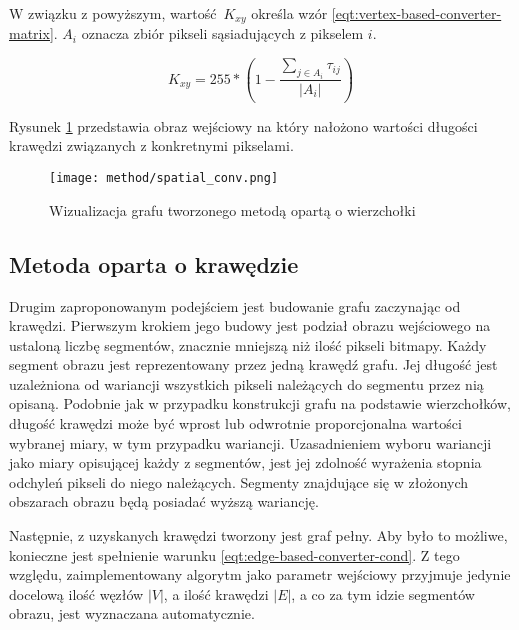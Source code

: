 {{{            W związku z powyższym, wartość $K_{xy}$ określa wzór \ref{eqt:vertex-based-converter-matrix}. $A_i$ oznacza
            zbiór pikseli sąsiadujących z pikselem $i$.

            \begin{equation}\label{eqt:vertex-based-converter-matrix}
                K_{xy} = 255 * (1 - \frac{\sum_{j \in A_i} \tau_{ij}}{|A_i|})
            \end{equation}

            Rysunek \ref{fig:method-vis-vertex} przedstawia obraz wejściowy na który nałożono wartości długości krawędzi
            związanych z konkretnymi pikselami.

            \begin{figure}
                \centering
                \texttt{[image: method/spatial\_conv.png]}
                \caption{Wizualizacja grafu tworzonego metodą opartą o wierzchołki}
                \label{fig:method-vis-vertex}
            \end{figure}
        }

        \subsection{Metoda oparta o krawędzie}\label{subsec:edge-method}
        {
            Drugim zaproponowanym podejściem jest budowanie grafu zaczynając od krawędzi. Pierwszym krokiem jego budowy
            jest podział obrazu wejściowego na ustaloną liczbę segmentów, znacznie mniejszą niż ilość pikseli
            bitmapy. Każdy segment obrazu jest reprezentowany przez jedną krawędź grafu. Jej długość jest uzależniona od
            wariancji wszystkich pikseli należących do segmentu przez nią opisaną. Podobnie jak w przypadku konstrukcji
            grafu na podstawie wierzchołków, długość krawędzi może być wprost lub odwrotnie proporcjonalna wartości
            wybranej miary, w tym przypadku wariancji. Uzasadnieniem wyboru wariancji jako miary opisującej każdy z
            segmentów, jest jej zdolność wyrażenia stopnia odchyleń pikseli do niego należących. Segmenty znajdujące się
            w złożonych obszarach obrazu będą posiadać wyższą wariancję.

            Następnie, z uzyskanych krawędzi tworzony jest graf pełny. Aby było to możliwe, konieczne jest spełnienie
            warunku \ref{eqt:edge-based-converter-cond}. Z tego względu, zaimplementowany algorytm jako parametr
            wejściowy przyjmuje jedynie docelową ilość węzłów $|V|$, a ilość krawędzi $|E|$, a co za tym idzie segmentów
            obrazu, jest wyznaczana automatycznie.

}}}
